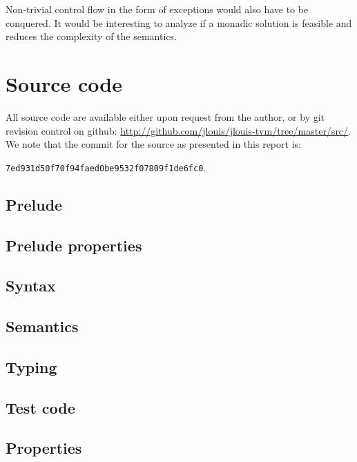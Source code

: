 \documentclass[a4paper, oneside, 10pt, draft]{memoir}
\begin{document}
Non-trivial control flow in the form of exceptions would also have to
be conquered. It would be interesting to analyze if a monadic solution
is feasible and reduces the complexity of the semantics.



\appendix
\chapter{Source code}
All source code are available either upon request from the author, or
by git revision control on github:
\url{http://github.com/jlouis/jlouis-tvm/tree/master/src/}. We note
that the commit for the source as presented in this report
is:
\begin{center}
  \texttt{7ed931d50f70f94faed0be9532f07809f1de6fc0}.
\end{center}

\section{Prelude}
{\footnotesize

}
\section{Prelude properties}
{\footnotesize

}
\section{Syntax}
{\footnotesize

}
\section{Semantics}
{\footnotesize

}
\section{Typing}
{\footnotesize

}
\section{Test code}
{\footnotesize

}
\section{Properties}
{\footnotesize

}
\end{document}
